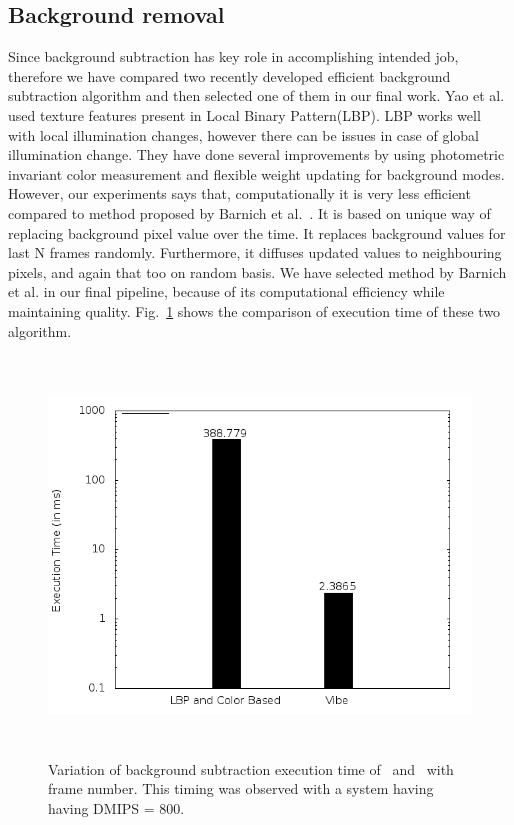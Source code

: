 \subsection{Background removal}
\indent Since background subtraction has key role in accomplishing
intended job, therefore we have compared two recently developed
efficient background subtraction algorithm and then selected one of them
in our final work. Yao et al.~\cite{11} used texture features
present in Local Binary Pattern(LBP). LBP works well with local
illumination changes, however there can be issues in case of global
illumination change. They have done several improvements by using
photometric invariant color measurement and flexible weight updating for
background modes. However, our experiments says that, computationally it
is very less efficient compared to method proposed by Barnich et al.~\cite{9}.
It is based on unique way of replacing
background pixel value over the time. It replaces background values for
last N frames randomly.  Furthermore, it diffuses updated values to
neighbouring pixels, and again that too on random basis. We have
selected method by Barnich et al. in our final pipeline,
because of its computational efficiency while maintaining quality.
Fig.~\ref{bg_compare} shows the comparison of execution time of these
two algorithm.
\begin{figure}[!t]
\centering
\includegraphics[height=300pt]{Figures/bg_compare}
\caption{Variation of background subtraction execution time of~\cite{11}
and~\cite{9} with frame number. This timing was observed with a system
having having DMIPS = 800.}
\label{bg_compare}
\end{figure}
